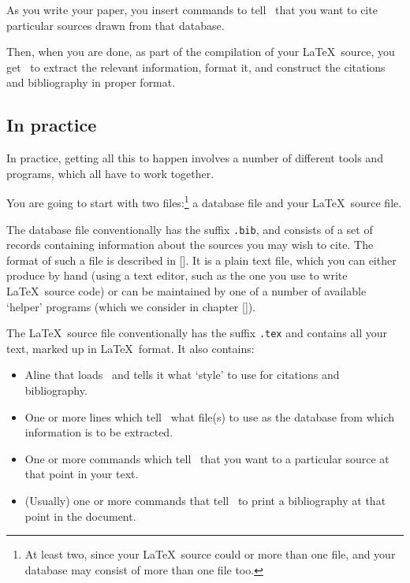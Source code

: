 As you write your paper, you insert commands to tell \biblatex\ that you want to cite particular sources drawn from that database.

Then, when you are done, as part of the compilation of your \LaTeX\ source, you get \biblatex\ to extract the relevant information, format it, and construct the citations and bibliography in proper format.

\subsection{In practice}

In practice, getting all this to happen involves a number of different tools and programs, which all have to work together.

You are going to start with two files:\footnote{At least two, since your \LaTeX\ source could  or  more than one file, and your database may consist of more than one file too.} a database file and your \LaTeX\ source file.

The database file conventionally has the suffix \texttt{.bib}, and consists of a set of records containing information about the sources you may wish to cite. The format of such a file is described in []. It is a plain text file, which you can either produce by hand (using a text editor, such as the one you use to write \LaTeX\ source code) or can be maintained by one of a number of available `helper' programs (which we consider in chapter []).

The \LaTeX\ source file conventionally has the suffix \texttt{.tex} and contains all your text, marked up in \LaTeX\ format. It also contains:
\begin{itemize}
\item Aline that loads \biblatex\ and tells it what `style' to use for citations and bibliography.
\item One or more lines which tell \biblatex\ what file(s) to use as the database from which information is to be extracted.
\item One or more commands which tell \biblatex\ that you want to  a particular source at that point in your text.
\item (Usually) one or more commands that tell \biblatex\ to print a bibliography at that point in the document.
\end{itemize}


